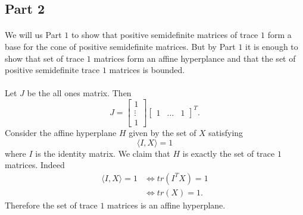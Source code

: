 \documentclass[letterpaper,12pt,oneside,onecolumn]{article}
\begin{document}
\subsection*{Part 2}
\paragraph{}
We will us Part $1$ to show that positive semidefinite matrices of trace $1$ form a base for the cone of positive semidefinite matrices. But by Part $1$ it is enough to show that set of trace $1$ matrices form an affine hyperplance and that the set of positive semidefinite trace $1$ matrices is bounded.
\paragraph{}
Let $J$ be the all ones matrix. Then $$J = \begin{bmatrix}
1 \\
\vdots \\
1
\end{bmatrix}\begin{bmatrix}
1& \hdots & 1
\end{bmatrix}^T.
$$
Consider the affine hyperplane $H$ given by the set of $X$ satisfying
$$\langle I, X \rangle = 1$$
where $I$ is the identity matrix.
We claim that $H$ is exactly the set of trace $1$ matrices. Indeed
\begin{align*}
\langle I , X \rangle = 1 &\iff tr(I^TX) = 1 \\
&\iff tr(X) = 1.
\end{align*} 
Therefore the set of trace $1$ matrices is an affine hyperplane.
\end{document}
